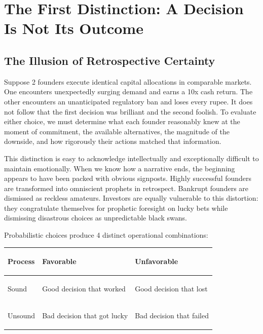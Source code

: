\section{The First Distinction: A Decision Is Not Its Outcome}

\subsection{The Illusion of Retrospective Certainty}

Suppose 2 founders execute identical capital allocations in comparable markets. One encounters unexpectedly surging demand and earns a 10x cash return. The other encounters an unanticipated regulatory ban and loses every rupee. It does not follow that the first decision was brilliant and the second foolish. To evaluate either choice, we must determine what each founder reasonably knew at the moment of commitment, the available alternatives, the magnitude of the downside, and how rigorously their actions matched that information.

This distinction is easy to acknowledge intellectually and exceptionally difficult to maintain emotionally. When we know how a narrative ends, the beginning appears to have been packed with obvious signposts. Highly successful founders are transformed into omniscient prophets in retrospect. Bankrupt founders are dismissed as reckless amateurs. Investors are equally vulnerable to this distortion: they congratulate themselves for prophetic foresight on lucky bets while dismissing disastrous choices as unpredictable black swans.

Probabilistic choices produce 4 distinct operational combinations:

\begin{tcolorbox}[
  enhanced,
  colback=BayesSurface!60,
  colframe=BayesBorder,
  boxrule=0.5pt,
  arc=3pt,
  left=3pt,right=3pt,top=3pt,bottom=3pt,
  boxsep=1pt
]
\scriptsize
\begin{tabularx}{\linewidth}{>{\bfseries\raggedright\arraybackslash}p{1.7cm} X X}
\toprule
\textbf{Process} & \textbf{Favorable} & \textbf{Unfavorable} \\
\midrule
Sound & Good decision that worked & Good decision that lost \\
\addlinespace[2pt]
Unsound & Bad decision that got lucky & Bad decision that failed \\
\bottomrule
\end{tabularx}
\end{tcolorbox}

